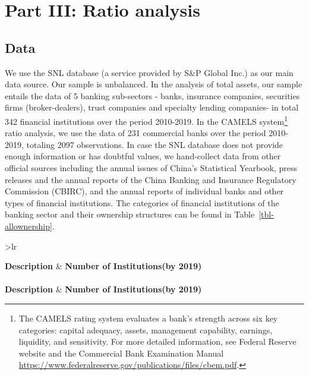 \documentclass[
  12pt,
  a4paper,
]{scrreprt}
\begin{document}
{{{{\section{Part III: Ratio analysis}\label{part-iii-ratio-analysis}

\subsection{Data}\label{data}

We use the SNL database (a service provided by S\&P Global Inc.) as our
main data source. Our sample is unbalanced. In the analysis of total
assets, our sample entails the data of 5 banking sub-sectors - banks,
insurance companies, securities firms (broker-dealers), trust companies
and specialty lending companies- in total 342 financial institutions
over the period 2010-2019. In the CAMELS system\footnote{The CAMELS
  rating system evaluates a bank's strength across six key categories:
  capital adequacy, assets, management capability, earnings, liquidity,
  and sensitivity. For more detailed information, see Federal Reserve
  website and the Commercial Bank Examination Manual
  \url{https://www.federalreserve.gov/publications/files/cbem.pdf}.}
ratio analysis, we use the data of 231 commercial banks over the period
2010-2019, totaling 2097 observations. In case the SNL database does not
provide enough information or has doubtful values, we hand-collect data
from other official sources including the annual issues of China's
Statistical Yearbook, press releases and the annual reports of the China
Banking and Insurance Regulatory Commission (CBIRC), and the annual
reports of individual banks and other types of financial institutions.
The categories of financial institutions of the banking sector and their
ownership structures can be found in Table~\ref{tbl-allownership}.

\begingroup\fontsize{8}{10}\selectfont

\begin{longtable}[t]{>{}lr}

\caption{\label{tbl-allownership}Ownership structure information of the
banking sector}

\tabularnewline

\toprule
\textbf{Description} & \textbf{Number of Institutions(by 2019)}\\
\midrule
\endfirsthead
{}\\
\toprule
\textbf{Description} & \textbf{Number of Institutions(by 2019)}\\
\midrule
\endhead


\end{longtable}}}}}
\end{document}
